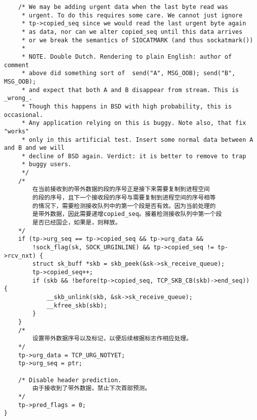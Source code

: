 \begin{verbatim}
    /* We may be adding urgent data when the last byte read was
     * urgent. To do this requires some care. We cannot just ignore
     * tp->copied_seq since we would read the last urgent byte again
     * as data, nor can we alter copied_seq until this data arrives
     * or we break the semantics of SIOCATMARK (and thus sockatmark())
     *
     * NOTE. Double Dutch. Rendering to plain English: author of comment
     * above did something sort of  send("A", MSG_OOB); send("B", MSG_OOB);
     * and expect that both A and B disappear from stream. This is _wrong_.
     * Though this happens in BSD with high probability, this is occasional.
     * Any application relying on this is buggy. Note also, that fix "works"
     * only in this artificial test. Insert some normal data between A and B and we will
     * decline of BSD again. Verdict: it is better to remove to trap
     * buggy users.
     */
    /*
        在当前接收到的带外数据的段的序号正是接下来需要复制到进程空间
        的段的序号，且下一个接收段的序号与需要复制到进程空间的序号相等
        的情况下，需要检测接收队列中的第一个段是否有效。因为当前处理的
        是带外数据，因此需要递增copied_seq。接着检测接收队列中第一个段
        是否已经国企，如果是，则释放。
    */
    if (tp->urg_seq == tp->copied_seq && tp->urg_data &&
        !sock_flag(sk, SOCK_URGINLINE) && tp->copied_seq != tp->rcv_nxt) {
        struct sk_buff *skb = skb_peek(&sk->sk_receive_queue);
        tp->copied_seq++;
        if (skb && !before(tp->copied_seq, TCP_SKB_CB(skb)->end_seq)) {
            __skb_unlink(skb, &sk->sk_receive_queue);
            __kfree_skb(skb);
        }
    }
    /*
        设置带外数据序号以及标记，以便后续根据标志作相应处理。
    */
    tp->urg_data = TCP_URG_NOTYET;
    tp->urg_seq = ptr;

    /* Disable header prediction. 
        由于接收到了带外数据，禁止下次首部预测。    
    */
    tp->pred_flags = 0;
}
\end{verbatim}
